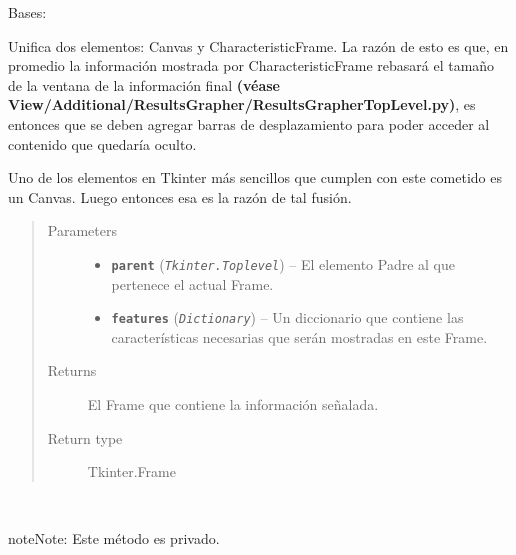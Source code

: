 \documentclass[letterpaper,10pt,english]{sphinxmanual}
\begin{document}
\begin{fulllineitems}
\label{View/Additional/MenuInternalOption/InternalOptionTab/FeatureFrame:View.Additional.MenuInternalOption.InternalOptionTab.FeatureFrame.FeatureFrame}
Bases: 

\begin{DUlineblock}{0em}
\item[] Unifica dos elementos: Canvas y CharacteristicFrame. La razón de esto es que, en promedio la
información mostrada por CharacteristicFrame rebasará el tamaño de la ventana de la información 
final \textbf{(véase View/Additional/ResultsGrapher/ResultsGrapherTopLevel.py)}, es entonces 
que se deben agregar barras de desplazamiento para poder acceder al contenido que quedaría oculto.
\item[] Uno de los elementos en Tkinter más sencillos que cumplen con este cometido es un
Canvas. Luego entonces esa es la razón de tal fusión.
\end{DUlineblock}
\begin{quote}\begin{description}
\item[{Parameters}] \leavevmode\begin{itemize}
\item {} 
\textbf{\texttt{parent}} (\emph{\texttt{Tkinter.Toplevel}}) -- El elemento Padre al que pertenece el actual
Frame.

\item {} 
\textbf{\texttt{features}} (\emph{\texttt{Dictionary}}) -- Un diccionario que contiene las características necesarias
que serán mostradas en este Frame.

\end{itemize}

\item[{Returns}] \leavevmode
El Frame que contiene la información señalada.

\item[{Return type}] \leavevmode
Tkinter.Frame

\end{description}\end{quote}

\begin{fulllineitems}
\label{View/Additional/MenuInternalOption/InternalOptionTab/FeatureFrame:View.Additional.MenuInternalOption.InternalOptionTab.FeatureFrame.FeatureFrame._FeatureFrame__update_scrollbar}~
\begin{notice}{note}{Note:}
Este método es privado.
\end{notice}


\end{fulllineitems}
\end{fulllineitems}
\end{document}
